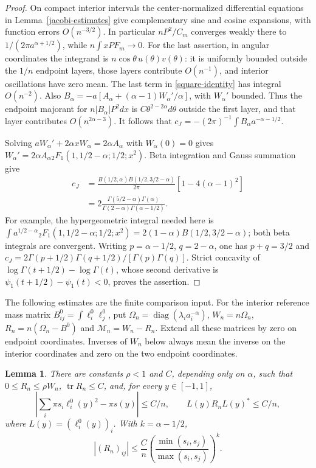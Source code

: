 \documentclass[a4paper,11pt]{amsart}
\newtheorem{lemma}[theorem]{Lemma}
\theoremstyle{remark}\newtheorem{remark}[theorem]{Remark}
\newcommand{\tr}{\operatorname{tr}}
\newcommand{\diag}{\operatorname{diag}}
\begin{document}
\begin{proof}
On compact interior intervals the center-normalized differential
equations in Lemma~\ref{jacobi-estimates} give complementary sine and
cosine expansions, with function errors $O(n^{-3/2})$. In particular
$nP^2/C_m$ converges weakly there to
$1/(2\pi a^{\alpha+1/2})$, while $n\int xPF_m\to0$.
For the last assertion, in angular coordinates the integrand is
$n\cos\theta\,u(\theta)v(\theta)$: it is uniformly bounded outside
the $1/n$ endpoint layers, those layers contribute $O(n^{-1})$,
and interior oscillations have zero mean. The last term in
\eqref{square-identity} has integral $O(n^{-2})$.
Also
$B_\alpha=-a[A_\alpha+(\alpha-1)W_\alpha'/\alpha]$,
with $W_\alpha'$ bounded. Thus the endpoint majorant for
$n|B_\alpha|P^2dx$ is $C\theta^{2-2\alpha}d\theta$ outside the
first layer, and that layer contributes $O(n^{2\alpha-3})$.
It follows that
$c_J=-(2\pi)^{-1}\int B_\alpha a^{-\alpha-1/2}$.

Solving $aW_\alpha'+2\alpha xW_\alpha=2\alpha A_\alpha$ with
$W_\alpha(0)=0$ gives
$W_\alpha'=2\alpha A_\alpha
 {}_2F_1(1,1/2-\alpha;1/2;x^2)$.
Beta integration and Gauss summation \cite[15.4.20]{dlmf} give
\begin{align*}
 c_J&=\frac{B(1/2,\alpha)B(1/2,3/2-\alpha)}{2\pi}
       [1-4(\alpha-1)^2]\\
 &=2\frac{\Gamma(5/2-\alpha)\Gamma(\alpha)}
 {\Gamma(2-\alpha)\Gamma(\alpha-1/2)}.
\end{align*}
For example, the hypergeometric integral needed here is
$\int a^{1/2-\alpha}{}_2F_1(1,1/2-\alpha;1/2;x^2)
 =2(1-\alpha)B(1/2,3/2-\alpha)$; both beta integrals are convergent.
Writing $p=\alpha-1/2$, $q=2-\alpha$, one has $p+q=3/2$ and
$c_J=2\Gamma(p+1/2)\Gamma(q+1/2)/[\Gamma(p)\Gamma(q)]$.
Strict concavity of $\log\Gamma(t+1/2)-\log\Gamma(t)$, whose second
derivative is $\psi_1(t+1/2)-\psi_1(t)<0$, proves the assertion.
\end{proof}

The following estimates are the finite comparison input. For the
interior reference mass matrix $B^0_{ij}=\int\ell_i^0\ell_j^0$, put
$\Omega_n=\diag(\lambda_i a_i^{-\alpha})$, $W_n=n\Omega_n$,
$R_n=n(\Omega_n-B^0)$ and $\mathcal M_n=W_n-R_n$. Extend all these
matrices by zero on endpoint coordinates. Inverses of $W_n$ below
always mean the inverse on the interior coordinates and zero on the
two endpoint coordinates.

\begin{lemma}\label{reference-rows}
There are constants $\rho<1$ and $C$, depending only on $\alpha$, such
that $0\le R_n\le\rho W_n$, $\tr R_n\le C$, and, for every $y\in[-1,1]$,
\begin{equation}\label{row-bounds}
 \left|\sum_i\pi s_i\ell_i^0(y)^2-\pi s(y)\right|\le C/n,
 \qquad L(y)R_nL(y)^*\le C/n,
\end{equation}
where $L(y)=(\ell_i^0(y))_i$. With $k=\alpha-1/2$,
\begin{equation}\label{entry-bound}
 |(R_n)_{ij}|\le\frac Cn
 \left(\frac{\min(s_i,s_j)}{\max(s_i,s_j)}\right)^k.
\end{equation}
\end{lemma}
\end{document}
